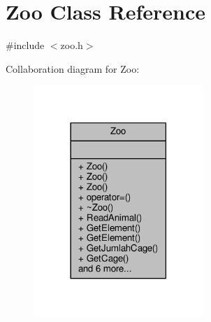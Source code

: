 \hypertarget{classZoo}{}\section{Zoo Class Reference}
\label{classZoo}


{\ttfamily \#include $<$zoo.\+h$>$}



Collaboration diagram for Zoo\+:
\nopagebreak
\begin{figure}[H]
\begin{center}
\leavevmode
\includegraphics[width=182pt]{classZoo__coll__graph}
\end{center}
\end{figure}
